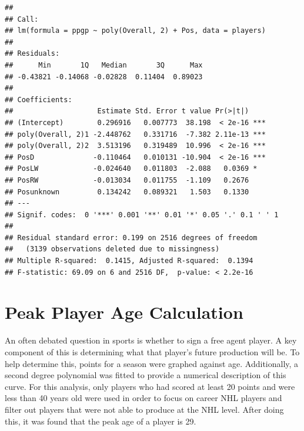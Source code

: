 \documentclass[]{article}
\begin{document}
\begin{verbatim}
## 
## Call:
## lm(formula = ppgp ~ poly(Overall, 2) + Pos, data = players)
## 
## Residuals:
##      Min       1Q   Median       3Q      Max 
## -0.43821 -0.14068 -0.02828  0.11404  0.89023 
## 
## Coefficients:
##                    Estimate Std. Error t value Pr(>|t|)    
## (Intercept)        0.296916   0.007773  38.198  < 2e-16 ***
## poly(Overall, 2)1 -2.448762   0.331716  -7.382 2.11e-13 ***
## poly(Overall, 2)2  3.513196   0.319489  10.996  < 2e-16 ***
## PosD              -0.110464   0.010131 -10.904  < 2e-16 ***
## PosLW             -0.024640   0.011803  -2.088   0.0369 *  
## PosRW             -0.013034   0.011755  -1.109   0.2676    
## Posunknown         0.134242   0.089321   1.503   0.1330    
## ---
## Signif. codes:  0 '***' 0.001 '**' 0.01 '*' 0.05 '.' 0.1 ' ' 1
## 
## Residual standard error: 0.199 on 2516 degrees of freedom
##   (3139 observations deleted due to missingness)
## Multiple R-squared:  0.1415, Adjusted R-squared:  0.1394 
## F-statistic: 69.09 on 6 and 2516 DF,  p-value: < 2.2e-16
\end{verbatim}

\hypertarget{peak-player-age-calculation}{%
\section{Peak Player Age
Calculation}\label{peak-player-age-calculation}}

An often debated question in sports is whether to sign a free agent
player. A key component of this is determining what that player's future
production will be. To help determine this, points for a season were
graphed against age. Additionally, a second degree polynomial was fitted
to provide a numerical description of this curve. For this analysis,
only players who had scored at least 20 points and were less than 40
years old were used in order to focus on career NHL players and filter
out players that were not able to produce at the NHL level. After doing
this, it was found that the peak age of a player is 29.
\end{document}
